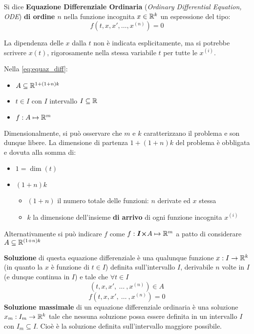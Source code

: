 \begin{definition}
	\label{def:equaz_diff}
	Si dice \textbf{Equazione Differenziale Ordinaria} (\textit{Ordinary Differential Equation, ODE}) \textbf{di ordine $n$} nella funzione incognita $x\in \mathbb{R}^k$ un espressione del tipo:
	\begin{equation}
		\label{eq:equaz_diff}
		f(t,x, x',\ldots,x^{(n)})=0
	\end{equation}
	\begin{note}
		La dipendenza delle $x$ dalla $t$ non è indicata esplicitamente, ma si potrebbe scrivere $x(t)$, rigorosamente nella stessa variabile $t$ per tutte le $x^{(i)}$.
	\end{note}
	Nella \cref{eq:equaz_diff}:
	\begin{itemize}
		\item $A\subseteq \mathbb{R}^{1+(1+n)k}$
		\item $t\in I$ con $I$ intervallo $I \subseteq \mathbb{R}$
		\item $f: A \mapsto \mathbb{R}^m$
	\end{itemize}
	Dimensionalmente, si può osservare che $m$ e $k$ caratterizzano il problema e son dunque libere. La dimensione di partenza $1+(1+n)k$ del problema è obbligata e dovuta alla somma di:
	\begin{itemize}
		\item $1 = \dim(t)$
		\item $(1+n)k$
		\begin{itemize}
			\item $(1+n)$ il numero totale delle funzioni: $n$ derivate ed $x$ stessa
			\item $k$ la dimensione dell'insieme \textbf{di arrivo} di ogni funzione incognita $x^{(i)}$
		\end{itemize}
	\end{itemize}
	\begin{note}
		Alternativamente si può indicare $f$ come $f: \boldsymbol{I \times} A \mapsto \mathbb{R}^m$ a patto di considerare $A\subseteq \mathbb{R}^{(1+n)k}$
	\end{note}
	\textbf{Soluzione} di questa equazione differenziale è una qualunque funzione $x:I\to \mathbb{R}^k$ (in quanto la $x$ è funzione di $t \in I$) definita sull'intervallo $I$, derivabile $n$ volte in $I$ (e dunque continua in $I$) e tale che $\forall t\in I$
	$$(t,x, x',\:\dotsc\:,x^{(n)}) \in A$$
	$$f(t,x, x',\:\dotsc\:,x^{(n)})=0$$
	\textbf{Soluzione massimale} di un equazione differenziale ordinaria è una soluzione $x_m:I_m\to \mathbb{R}^k$ tale che nessuna soluzione possa essere definita in un intervallo $I$ con $I_m\subseteq I$. Cioè è la soluzione definita sull'intervallo maggiore possibile.


\end{definition}

